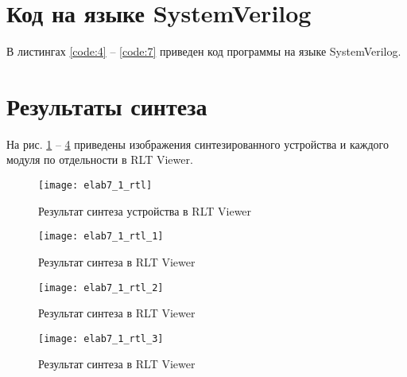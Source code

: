 \section{Код на языке SystemVerilog}

В листингах \ref{code:4} -- \ref{code:7} приведен код программы на языке SystemVerilog.









\section{Результаты синтеза}

На рис. \ref{fig:elab7_1_rtl} -- \ref{fig:elab7_1_rtl_3} приведены изображения синтезированного устройства и каждого модуля по отдельности в RLT Viewer.

\begin{figure}[H]
\begin{center}
	\texttt{[image: elab7\_1\_rtl]}
	\caption{Результат синтеза устройства в RLT Viewer}
	\label{fig:elab7_1_rtl}
\end{center}
\end{figure}

\begin{figure}[H]
\begin{center}
	\texttt{[image: elab7\_1\_rtl\_1]}
	\caption{Результат синтеза  в RLT Viewer}
	\label{fig:elab7_1_rtl_1}
\end{center}
\end{figure}

\begin{figure}[H]
\begin{center}
	\texttt{[image: elab7\_1\_rtl\_2]}
	\caption{Результат синтеза  в RLT Viewer}
	\label{fig:elab7_1_rtl_2}
\end{center}
\end{figure}

\begin{figure}[H]
\begin{center}
	\texttt{[image: elab7\_1\_rtl\_3]}
	\caption{Результат синтеза  в RLT Viewer}
	\label{fig:elab7_1_rtl_3}
\end{center}
\end{figure}

